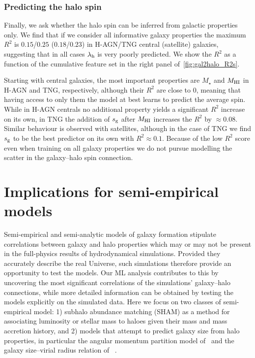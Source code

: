 \documentclass[usenatbib,useAMS]{mnras}
\begin{document}
\subsubsection{Predicting the halo spin}

Finally, we ask whether the halo spin can be inferred from galactic properties only. We find that if we consider all informative galaxy properties the maximum $R^2$ is $0.15$/$0.25$ ($0.18$/$0.23$) in H-AGN/TNG central (satellite) galaxies, suggesting that in all cases $\lambda_{\rm h}$ is very poorly predicted. We show the $R^2$ as a function of the cumulative feature set in the right panel of~\cref{fig:gal2halo_R2s}.

Starting with central galaxies, the most important properties are $M_\star$ and $M_{\rm HI}$ in H-AGN and TNG, respectively, although their $R^2$ are close to $0$, meaning that having access to only them the model at best learns to predict the average spin. While in H-AGN centrals no additional property yields a significant $R^2$ increase on its own, in TNG the addition of $s_{\rm g}$ after $M_{\rm HI}$ increases the $R^2$ by $\approx 0.08$. Similar behaviour is observed with satellites, although in the case of TNG we find $s_{\rm g}$ to be the best predictor on its own with $R^2\approx0.1$. Because of the low $R^2$ score even when training on all galaxy properties we do not pursue modelling the scatter in the galaxy--halo spin connection.



\section{Implications for semi-empirical models}
\label{sec:test_sam}

Semi-empirical and semi-analytic models of galaxy formation stipulate correlations between galaxy and halo properties which may or may not be present in the full-physics results of hydrodynamical simulations. Provided they accurately describe the real Universe, such simulations therefore provide an opportunity to test the models. Our ML analysis contributes to this by uncovering the most significant correlations of the simulations' galaxy--halo connections, while more detailed information can be obtained by testing the models explicitly on the simulated data. Here we focus on two classes of semi-empirical model: 1) subhalo abundance matching (SHAM) as a method for associating luminosity or stellar mass to haloes given their mass and mass accretion history, and 2) models that attempt to predict galaxy size from halo properties, in particular the angular momentum partition model of~\cite{Fall_Efstathiou_1980,MMW_1998} and the galaxy size--virial radius relation of ~\cite{Kravtsov_2013}.
\end{document}
